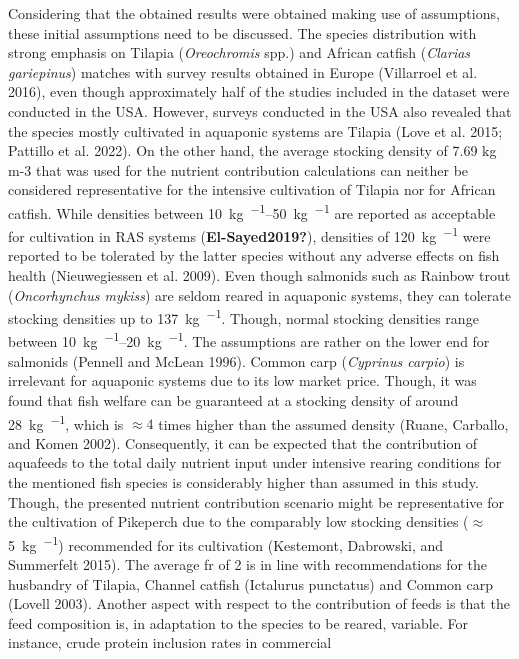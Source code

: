 \documentclass[preprint, 3p,
authoryear]{elsarticle} %
\begin{document}
Considering that the obtained results were obtained making use of
assumptions, these initial assumptions need to be discussed. The species
distribution with strong emphasis on Tilapia (\emph{Oreochromis} spp.)
and African catfish (\emph{Clarias gariepinus}) matches with survey
results obtained in Europe (Villarroel et al. 2016), even though
approximately half of the studies included in the dataset were conducted
in the USA. However, surveys conducted in the USA also revealed that the
species mostly cultivated in aquaponic systems are Tilapia (Love et al.
2015; Pattillo et al. 2022). On the other hand, the average stocking
density of 7.69 kg m-3 that was used for the nutrient contribution
calculations can neither be considered representative for the intensive
cultivation of Tilapia nor for African catfish. While densities between
\SIrange{10}{50}{\kg\per\cubicm} are reported as acceptable for
cultivation in RAS systems (\textbf{El-Sayed2019?}), densities of
\SI{120}{\kg\per\cubicm} were reported to be tolerated by the latter
species without any adverse effects on fish health (Nieuwegiessen et al.
2009). Even though salmonids such as Rainbow trout
(\emph{Oncorhynchus mykiss}) are seldom reared in aquaponic systems,
they can tolerate stocking densities up to \SI{137}{\kg\per\cubicm}.
Though, normal stocking densities range between
\SIrange{10}{20}{\kg\per\cubicm}. The assumptions are rather on the
lower end for salmonids (Pennell and McLean 1996). Common carp
(\emph{Cyprinus carpio}) is irrelevant for aquaponic systems due to its
low market price. Though, it was found that fish welfare can be
guaranteed at a stocking density of around \SI{28}{\kg\per\cubicm},
which is \(\approx 4\) times higher than the assumed density (Ruane,
Carballo, and Komen 2002). Consequently, it can be expected that the
contribution of aquafeeds to the total daily nutrient input under
intensive rearing conditions for the mentioned fish species is
considerably higher than assumed in this study. Though, the presented
nutrient contribution scenario might be representative for the
cultivation of Pikeperch due to the comparably low stocking densities
(\(\approx\)\SI{5}{\kg\per\cubicm}) recommended for its cultivation
(Kestemont, Dabrowski, and Summerfelt 2015). The average \gls{fr} of
\SI{2}{\p} is in line with recommendations for the husbandry of Tilapia,
Channel catfish (Ictalurus punctatus) and Common carp (Lovell 2003).
Another aspect with respect to the contribution of feeds is that the
feed composition is, in adaptation to the species to be reared,
variable. For instance, crude protein inclusion rates in commercial
\end{document}
